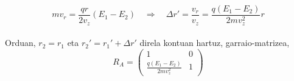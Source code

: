 \documentclass[12pt]{article}
\numberwithin{figure}{section}
\numberwithin{equation}{section}
\begin{document}
\begin{equation}
    mv_r=\frac{qr}{2v_z}(E_1-E_2) \quad \Longrightarrow \quad \Delta r' = \frac{v_r}{v_z}=\frac{q(E_1-E_2)}{2mv_z^2}r
\end{equation}\\

Orduan, $r_2=r_1$ eta $r_2'=r_1'+\Delta r'$ direla kontuan hartuz, garraio-matrizea,\\

\begin{equation}
\boxed{
    R_A = \begin{pmatrix}
            1 & 0\\
            \frac{q(E_1-E_2)}{2mv_z^2} & 1
    \end{pmatrix}
}
\end{equation}\\
\end{document}
